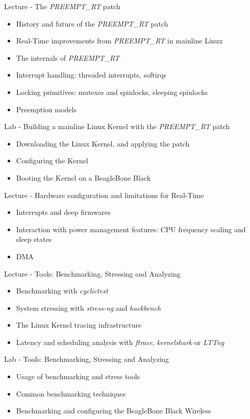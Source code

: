 \documentclass[a4paper,12pt,obeyspaces,spaces,hyphens]{article}
\begin{document}
\feagendatwocolumn
{Lecture - The {\em PREEMPT\_RT} patch}
{
  \begin{itemize}
  \item History and future of the {\em PREEMPT\_RT} patch
  \item Real-Time improvements from {\em PREEMPT\_RT} in mainline Linux
  \item The internals of {\em PREEMPT\_RT}
  \item Interrupt handling: threaded interrupts, softirqs
  \item Locking primitives: mutexes and spinlocks, sleeping spinlocks
  \item Preemption models
  \end{itemize}
}
{Lab - Building a mainline Linux Kernel with the {\em PREEMPT\_RT} patch}
{
  \begin{itemize}
  \item Downloading the Linux Kernel, and applying the patch
  \item Configuring the Kernel
  \item Booting the Kernel on a BeagleBone Black
 \end{itemize}
}

\feagendaonecolumn
{Lecture - Hardware configuration and limitations for Real-Time}
{
  \begin{itemize}
  \item Interrupts and deep firmwares
  \item Interaction with power management features: CPU frequency
    scaling and sleep states
  \item DMA
  \end{itemize}
}

\feagendatwocolumn
{Lecture - Tools: Benchmarking, Stressing and Analyzing}
{
  \begin{itemize}
  \item Benchmarking with {\em cyclictest}
  \item System stressing with {\em stress-ng} and {\em hackbench}
  \item The Linux Kernel tracing infrastructure
  \item Latency and scheduling analysis with {\em ftrace}, {\em
      kernelshark} or {\em LTTng}
  \end{itemize}
}
{Lab - Tools: Benchmarking, Stressing and Analyzing}
{
  \begin{itemize}
  \item Usage of benchmarking and stress tools
  \item Common benchmarking techniques
  \item Benchmarking and configuring the BeagleBone Black Wireless
  \end{itemize}
}
\end{document}
